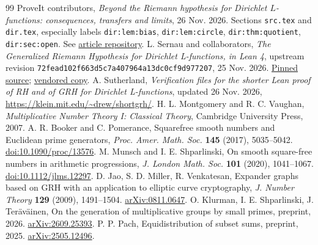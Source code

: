 \documentclass[11pt]{article}
\theoremstyle{remark}\newtheorem{remark}[theorem]{Remark}
\begin{document}
\begin{thebibliography}{99}
 ProveIt contributors, \emph{Beyond the Riemann hypothesis for Dirichlet $L$-functions: consequences, transfers and limits}, 26 Nov. 2026. Sections \texttt{src.tex} and \texttt{dir.tex}, especially labels \texttt{dir:lem:bias}, \texttt{dir:lem:circle}, \texttt{dir:thm:quotient}, \texttt{dir:sec:open}. See \href{https://github.com/VladimirReshetnikov/ProveIt/tree/main/Analysis/GeneralizedRiemannHypothesis/Article}{article repository}.
 L. Sernau and collaborators, \emph{The Generalized Riemann Hypothesis for Dirichlet L-functions, in Lean 4}, upstream revision \texttt{72fead102f663d5c7a407964a13dc0cf9d977207}, 25 Nov. 2026. \href{https://github.com/lsernau/grh-lean/tree/72fead102f663d5c7a407964a13dc0cf9d977207/grh}{Pinned source}; \href{https://github.com/VladimirReshetnikov/ProveIt/tree/main/Analysis/GeneralizedRiemannHypothesis/vendor/grh-lean}{vendored copy}.
 A. Sutherland, \emph{Verification files for the shorter Lean proof of RH and of GRH for Dirichlet L-functions}, updated 26 Nov. 2026, \url{https://klein.mit.edu/~drew/shortgrh/}.
 H. L. Montgomery and R. C. Vaughan, \emph{Multiplicative Number Theory I: Classical Theory}, Cambridge University Press, 2007.
 A. R. Booker and C. Pomerance, Squarefree smooth numbers and Euclidean prime generators, \emph{Proc. Amer. Math. Soc.} \textbf{145} (2017), 5035--5042. \href{https://doi.org/10.1090/proc/13576}{doi:10.1090/proc/13576}.
 M. Munsch and I. E. Shparlinski, On smooth square-free numbers in arithmetic progressions, \emph{J. London Math. Soc.} \textbf{101} (2020), 1041--1067. \href{https://doi.org/10.1112/jlms.12297}{doi:10.1112/jlms.12297}.
 D. Jao, S. D. Miller, R. Venkatesan, Expander graphs based on GRH with an application to elliptic curve cryptography, \emph{J. Number Theory} \textbf{129} (2009), 1491--1504. \href{https://arxiv.org/abs/0811.0647}{arXiv:0811.0647}.
 O. Klurman, I. E. Shparlinski, J. Ter\"av\"ainen, On the generation of multiplicative groups by small primes, preprint, 2026. \href{https://arxiv.org/abs/2609.25393}{arXiv:2609.25393}.
 P. P. Pach, Equidistribution of subset sums, preprint, 2025. \href{https://arxiv.org/abs/2505.12496}{arXiv:2505.12496}.
\end{thebibliography}
\end{document}
